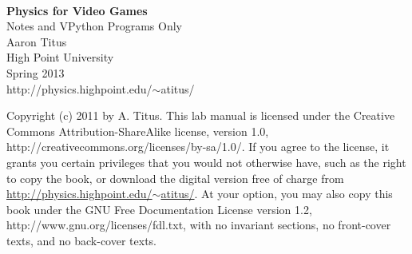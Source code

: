\documentclass[10pt]{tituslab}
\begin{document}
\myeqnspacing %
\frontmatter
\yesiwantarabic
\frontmatter
\thispagestyle{empty}
\noindent\vspace{0mm}\\
\noindent\vspace{10mm}\hspace{6mm}\textsf{\textbf{\Huge{Physics for Video Games}}}\\
\noindent\vspace{4mm}\hspace{3.5in}\textsf{\Large{Notes and VPython Programs Only}}\\
\noindent\vspace{4mm}\hspace{3.5in}\textsf{\Large{Aaron Titus}}\\
\noindent\vspace{4mm}\hspace{3.5in}\textsf{\Large{High Point University}}\\
\noindent\vspace{4mm}\hspace{3.5in}\textsf{Spring 2013}\\
\noindent\vspace{4mm}\hspace{3.5in}\textsf{http://physics.highpoint.edu/$\sim$atitus/}
\yesiwantarabic
\mynormaltype

\pagebreak[4]
\noindent
Copyright (c) 2011 by A. Titus. This lab manual is
    licensed under the Creative Commons
    Attribution-ShareAlike license, version 1.0, 
    http://creativecommons.org/licenses/by-sa/1.0/.
    If you agree to the license, it grants you certain privileges that
    you would not otherwise have, such as the right to copy the book,
    or download the digital version free of charge from
    \href{http://physics.highpoint.edu/~atitus/}{http://physics.highpoint.edu/$\sim$atitus/}. At your option, you may also copy this book
    under the GNU Free Documentation License version 1.2, http://www.gnu.org/licenses/fdl.txt,
    with no invariant sections, no front-cover texts, and no back-cover texts.


\tableofcontents
\mainmatter
\startchaptersonleftpage
\addtocounter{page}{4} 
\parafmt
\myeqnspacing %
\end{document}
